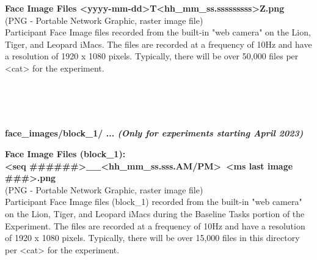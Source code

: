 \begin{description}
\begin{addmargin}[0em]{0em}
    \begin{addmargin}[1em]{0em} %
        \textbf{Face Image Files <yyyy-mm-dd>T<hh\_mm\_ss.sssssssss>Z.png}\\
        (PNG - Portable Network Graphic, raster image file)\\
        Participant Face Image files recorded from the built-in "web camera" on the Lion, Tiger, and Leopard iMacs.
        The files are recorded at a frequency of 10Hz and have a resolution of 1920 x 1080 pixels.
        Typically, there will be over 50,000 files per <cat> for the experiment. 
    \end{addmargin} %

\end{addmargin} %


\textbf{\\\\\\}
\begin{addmargin}[0em]{0em} %
    \textbf{face\_images/block\_1/ ... \textit{(Only for experiments starting April 2023)}}

    \begin{addmargin}[1em]{0em} %
        \textbf{Face Image Files (block\_1):\\<seq \#\#\#\#\#\#>\_<yyyy-mm-dd>\_<hh\_mm\_ss.sss.AM/PM>~<ms last image \#\#\#>.png}\\
        (PNG - Portable Network Graphic, raster image file)\\
        Participant Face Image files (block\_1) recorded from the built-in "web camera" on the Lion, Tiger,
        and Leopard iMacs during the Baseline Tasks portion of the Experiment.
        The files are recorded at a frequency of 10Hz and have a resolution of 1920 x 1080 pixels.
        Typically, there will be over 15,000 files in this directory per <cat> for the experiment. 
    \end{addmargin} %

\end{addmargin} %



\end{description}
